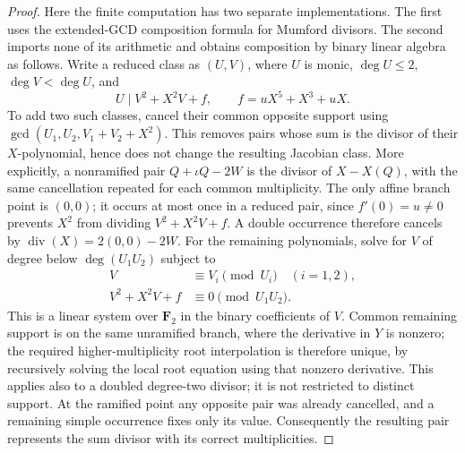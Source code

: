\begin{proof}
Here the finite computation has two separate implementations.
The first uses the extended-GCD composition formula for Mumford
divisors.  The second imports none of its arithmetic and obtains
composition by binary linear algebra as follows.  Write a reduced
class as $(U,V)$, where $U$ is monic, $\deg U\le2$,
$\deg V<\deg U$, and
\[
                         U\mid V^2+X^2V+f,
                \qquad f=uX^5+X^3+uX.
 \tag{OR.10}
\]
To add two such classes, cancel their common opposite support
using $\gcd(U_1,U_2,V_1+V_2+X^2)$.  This removes pairs whose
sum is the divisor of their $X$-polynomial, hence does not change
the resulting Jacobian class.  More explicitly, a nonramified
pair $Q+\iota Q-2W$ is the divisor of $X-X(Q)$, with the
same cancellation repeated for each common multiplicity.  The
only affine branch point is $(0,0)$; it occurs at most once in
a reduced pair, since $f'(0)=u\ne0$ prevents $X^2$ from
dividing $V^2+X^2V+f$.  A double occurrence therefore cancels
by $\operatorname{div}(X)=2(0,0)-2W$.
For the remaining polynomials,
solve for $V$ of degree below $\deg(U_1U_2)$ subject to
\[
 \begin{aligned}
 V&\equiv V_i\pmod{U_i}\quad(i=1,2),\\
 V^2+X^2V+f&\equiv0\pmod{U_1U_2}.
 \end{aligned}
 \tag{OR.11}
\]
This is a linear system over $\mathbf F_2$ in the binary
coefficients of $V$.  Common remaining support is on the same
unramified branch, where the derivative in $Y$ is nonzero;
the required higher-multiplicity root interpolation is therefore
unique, by recursively solving the local root equation using
that nonzero derivative.  This applies also to a doubled
degree-two divisor; it is not restricted to distinct support.
At the ramified point any opposite pair was already cancelled,
and a remaining simple occurrence fixes only its value.
Consequently the resulting pair represents the sum divisor
with its correct multiplicities.


\end{proof}
